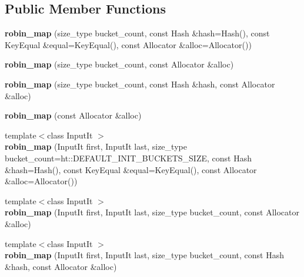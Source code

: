 \subsection*{Public Member Functions}
\begin{DoxyCompactItemize}
\item 
\mbox{\label{classtsl_1_1robin__map_acc1834ad92dfd249d5021806ad3aafb1}} 
{\bfseries robin\+\_\+map} (size\+\_\+type bucket\+\_\+count, const Hash \&hash=Hash(), const Key\+Equal \&equal=Key\+Equal(), const Allocator \&alloc=Allocator())
\item 
\mbox{\label{classtsl_1_1robin__map_a1eae4ec00d7f3a56a16f4aaa17e07b80}} 
{\bfseries robin\+\_\+map} (size\+\_\+type bucket\+\_\+count, const Allocator \&alloc)
\item 
\mbox{\label{classtsl_1_1robin__map_adc6b1af67363e83137a69eec2e713a63}} 
{\bfseries robin\+\_\+map} (size\+\_\+type bucket\+\_\+count, const Hash \&hash, const Allocator \&alloc)
\item 
\mbox{\label{classtsl_1_1robin__map_af9a0f87ce0766d78fde4c19e3c353bdf}} 
{\bfseries robin\+\_\+map} (const Allocator \&alloc)
\item 
\mbox{\label{classtsl_1_1robin__map_af1879e296bca879af2c0672ca55b81c3}} 
{\footnotesize template$<$class Input\+It $>$ }\\{\bfseries robin\+\_\+map} (Input\+It first, Input\+It last, size\+\_\+type bucket\+\_\+count=ht\+::\+D\+E\+F\+A\+U\+L\+T\+\_\+\+I\+N\+I\+T\+\_\+\+B\+U\+C\+K\+E\+T\+S\+\_\+\+S\+I\+ZE, const Hash \&hash=Hash(), const Key\+Equal \&equal=Key\+Equal(), const Allocator \&alloc=Allocator())
\item 
\mbox{\label{classtsl_1_1robin__map_a59eaac9616c340aae2e01fd19041ddb3}} 
{\footnotesize template$<$class Input\+It $>$ }\\{\bfseries robin\+\_\+map} (Input\+It first, Input\+It last, size\+\_\+type bucket\+\_\+count, const Allocator \&alloc)
\item 
\mbox{\label{classtsl_1_1robin__map_a0154d4ae74047ca0e7749dccab97a68b}} 
{\footnotesize template$<$class Input\+It $>$ }\\{\bfseries robin\+\_\+map} (Input\+It first, Input\+It last, size\+\_\+type bucket\+\_\+count, const Hash \&hash, const Allocator \&alloc)

\end{DoxyCompactItemize}
